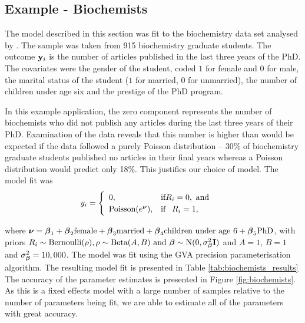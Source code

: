 \subsection{Example - Biochemists}
\label{sec:biochemists}

The model described in this section was fit to the biochemistry data set
analysed by \cite{Long1990}. The sample was taken from 915 biochemistry
graduate students. The outcome ${\bf y}_i$ is the number of articles published in
the last three years of the PhD. The covariates were the gender of the student,
coded $1$ for female and $0$ for male, the marital status of the student ($1$
for married, $0$ for unmarried), the number of children under age six and the
prestige of the PhD program.

In this example application, the zero component represents the number of
biochemists who did not publish any articles during the last three years of
their PhD. Examination of the data reveals that this number is higher than
would be expected if the data followed a purely Poisson distribution -- 30\% of
biochemistry graduate students published no articles in their final years
whereas a Poisson distribution would predict only 18\%. This justifies our
choice of model. The model fit was
$$
	y_i = \begin{cases}
	\begin{array}{ll}
	0, & \text{if} R_i = 0, \text{ and }\\
	\text{Poisson}(e^{\boldsymbol \nu}), & \text{if} \phantom{-} R_i = 1,
	\end{array}
	\end{cases}
$$

\noindent where ${\boldsymbol \nu} = {\boldsymbol \beta}_1 + {\boldsymbol \beta}_2 \text{female} + {\boldsymbol \beta}_3
\text{married} + {\boldsymbol \beta}_4 \text{children under age 6} + {\boldsymbol \beta}_5 \text{PhD}$,
with priors
$R_i \sim \text{Bernoulli}(\rho), 
\rho \sim \text{Beta}(A, B) \text{ and } 
{\boldsymbol\beta} \sim \text{N}(0, \sigma_{{\boldsymbol \beta}}^2 {\bf I})$
and $A=1$, $B=1$ and $\sigma_{\boldsymbol \beta}^2 = 10,000$. The model was fit
using the GVA precision parameterisation algorithm. The resulting model fit is
presented in Table \ref{tab:biochemists_results} The accuracy of the parameter
estimates is presented in Figure \ref{fig:biochemists}. As this is a fixed
effects model with a large number of samples relative to the number of
parameters being fit, we are able to estimate all of the parameters with great
accuracy.

